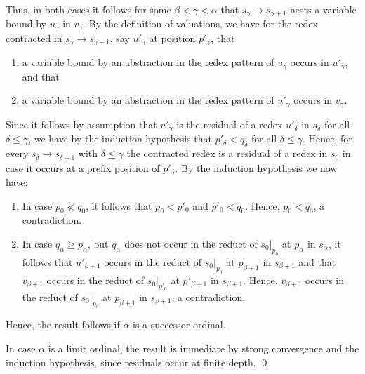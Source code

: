 \documentclass{LMCS}
\theoremstyle{plain}
\theoremstyle{definition}
\newcommand{\rew}{\rightarrow}
\begin{document}
Thus, in both cases it follows for some $\beta < \gamma < \alpha$ that $s_\gamma \rew s_{\gamma + 1}$ nests a variable bound by $u_\gamma$ in $v_\gamma$. By the definition of valuations, we have for the redex contracted in $s_\gamma \rew s_{\gamma + 1}$, say $u'_\gamma$ at position $p'_\gamma$, that
\begin{enumerate}[(1)]
\item
a variable bound by an abstraction in the redex pattern of $u_\gamma$ occurs in $u'_\gamma$, and that
\item
a variable bound by an abstraction in the redex pattern of $u'_\gamma$ occurs in $v_\gamma$. 
\end{enumerate}
Since it follows by assumption that $u'_\gamma$ is the residual of a redex $u'_\delta$ in $s_\delta$ for all $\delta \leq \gamma$, we have by the induction hypothesis that $p'_\delta < q_\delta$ for all $\delta \leq \gamma$. Hence, for every $s_\delta \rew s_{\delta + 1}$ with $\delta \leq \gamma$ the contracted redex is a residual of a redex in $s_0$ in case it occurs at a prefix position of $p'_\gamma$. By the induction hypothesis we now have:
\begin{enumerate}[$\bullet$]
\item
In case $p_0 \not < q_0$, it follows that $p_0 < p'_0$ and $p'_0 < q_0$. Hence, $p_0 < q_0$, a contradiction.

\item
In case $q_\alpha \geq p_\alpha$, but $q_\alpha$ does not occur in the reduct of $s_0|_{p_0}$ at $p_\alpha$ in $s_\alpha$, it follows that $u'_{\beta + 1}$ occurs in the reduct of $s_0|_{p_0}$ at $p_{\beta + 1}$ in $s_{\beta + 1}$ and that $v_{\beta + 1}$ occurs in the reduct of $s_0|_{p'_0}$ at $p'_{\beta + 1}$ in $s_{\beta + 1}$. Hence, $v_{\beta + 1}$ occurs in the reduct of $s_0|_{p_0}$ at $p_{\beta + 1}$ in $s_{\beta + 1}$, a contradiction.
\end{enumerate}
Hence, the result follows if $\alpha$ is a successor ordinal.

In case $\alpha$ is a limit ordinal, the result is immediate by strong convergence and the induction hypothesis, since residuals occur at finite depth. \qed
\end{document}

